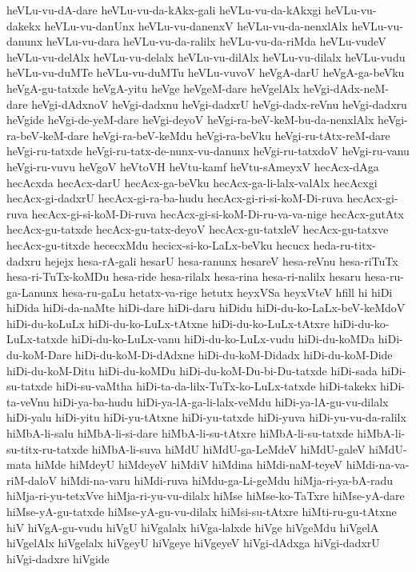 {heVLu-vu-dA-dare
heVLu-vu-da-kAkx-gali
heVLu-vu-da-kAkxgi
heVLu-vu-dakekx
heVLu-vu-danUnx
heVLu-vu-danenxV
heVLu-vu-da-nenxlAlx
heVLu-vu-danunx
heVLu-vu-dara
heVLu-vu-da-ralilx
heVLu-vu-da-riMda
heVLu-vudeV
heVLu-vu-delAlx
heVLu-vu-delalx
heVLu-vu-dilAlx
heVLu-vu-dilalx
heVLu-vudu
heVLu-vu-duMTe
heVLu-vu-duMTu
heVLu-vuvoV
heVgA-darU
heVgA-ga-beVku
heVgA-gu-tatxde
heVgA-yitu
heVge
heVgeM-dare
heVgelAlx
heVgi-dAdx-neM-dare
heVgi-dAdxnoV
heVgi-dadxnu
heVgi-dadxrU
heVgi-dadx-reVnu
heVgi-dadxru
heVgide
heVgi-de-yeM-dare
heVgi-deyoV
heVgi-ra-beV-keM-bu-da-nenxlAlx
heVgi-ra-beV-keM-dare
heVgi-ra-beV-keMdu
heVgi-ra-beVku
heVgi-ru-tAtx-reM-dare
heVgi-ru-tatxde
heVgi-ru-tatx-de-nunx-vu-danunx
heVgi-ru-tatxdoV
heVgi-ru-vanu
heVgi-ru-vuvu
heVgoV
heVtoVH
heVtu-kamf
heVtu-sAmeyxV
hecAcx-dAga
hecAcxda
hecAcx-darU
hecAcx-ga-beVku
hecAcx-ga-li-lalx-valAlx
hecAcxgi
hecAcx-gi-dadxrU
hecAcx-gi-ra-ba-hudu
hecAcx-gi-ri-si-koM-Di-ruva
hecAcx-gi-ruva
hecAcx-gi-si-koM-Di-ruva
hecAcx-gi-si-koM-Di-ru-va-va-nige
hecAcx-gutAtx
hecAcx-gu-tatxde
hecAcx-gu-tatx-deyoV
hecAcx-gu-tatxleV
hecAcx-gu-tatxve
hecAcx-gu-titxde
hececxMdu
hecicx-si-ko-LaLx-beVku
hecucx
heda-ru-titx-dadxru
hejejx
hesa-rA-gali
hesarU
hesa-ranunx
hesareV
hesa-reVnu
hesa-riTuTx
hesa-ri-TuTx-koMDu
hesa-ride
hesa-rilalx
hesa-rina
hesa-ri-nalilx
hesaru
hesa-ru-ga-Lanunx
hesa-ru-gaLu
hetatx-va-rige
hetutx
heyxVSa
heyxVteV
hfill
hi
hiDi
hiDida
hiDi-da-naMte
hiDi-dare
hiDi-daru
hiDidu
hiDi-du-ko-LaLx-beV-keMdoV
hiDi-du-koLuLx
hiDi-du-ko-LuLx-tAtxne
hiDi-du-ko-LuLx-tAtxre
hiDi-du-ko-LuLx-tatxde
hiDi-du-ko-LuLx-vanu
hiDi-du-ko-LuLx-vudu
hiDi-du-koMDa
hiDi-du-koM-Dare
hiDi-du-koM-Di-dAdxne
hiDi-du-koM-Didadx
hiDi-du-koM-Dide
hiDi-du-koM-Ditu
hiDi-du-koMDu
hiDi-du-koM-Du-bi-Du-tatxde
hiDi-sada
hiDi-su-tatxde
hiDi-su-vaMtha
hiDi-ta-da-lilx-TuTx-ko-LuLx-tatxde
hiDi-takekx
hiDi-ta-veVnu
hiDi-ya-ba-hudu
hiDi-ya-lA-ga-li-lalx-veMdu
hiDi-ya-lA-gu-vu-dilalx
hiDi-yalu
hiDi-yitu
hiDi-yu-tAtxne
hiDi-yu-tatxde
hiDi-yuva
hiDi-yu-vu-da-ralilx
hiMbA-li-salu
hiMbA-li-si-dare
hiMbA-li-su-tAtxre
hiMbA-li-su-tatxde
hiMbA-li-su-titx-ru-tatxde
hiMbA-li-suva
hiMdU
hiMdU-ga-LeMdeV
hiMdU-galeV
hiMdU-mata
hiMde
hiMdeyU
hiMdeyeV
hiMdiV
hiMdina
hiMdi-naM-teyeV
hiMdi-na-va-riM-daloV
hiMdi-na-varu
hiMdi-ruva
hiMdu-ga-Li-geMdu
hiMja-ri-ya-bA-radu
hiMja-ri-yu-tetxVve
hiMja-ri-yu-vu-dilalx
hiMse
hiMse-ko-TaTxre
hiMse-yA-dare
hiMse-yA-gu-tatxde
hiMse-yA-gu-vu-dilalx
hiMsi-su-tAtxre
hiMti-ru-gu-tAtxne
hiV
hiVgA-gu-vudu
hiVgU
hiVgalalx
hiVga-lalxde
hiVge
hiVgeMdu
hiVgelA
hiVgelAlx
hiVgelalx
hiVgeyU
hiVgeye
hiVgeyeV
hiVgi-dAdxga
hiVgi-dadxrU
hiVgi-dadxre
hiVgide
}
